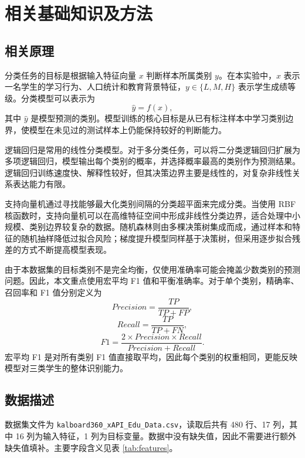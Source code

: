 \documentclass[UTF8,a4paper,12pt]{ctexart}
\begin{document}
\section{相关基础知识及方法}

\subsection{相关原理}

分类任务的目标是根据输入特征向量 $x$ 判断样本所属类别 $y$。在本实验中，$x$ 表示一名学生的学习行为、人口统计和教育背景特征，$y\in\{L,M,H\}$ 表示学生成绩等级。分类模型可以表示为
\begin{equation}
    \hat{y}=f(x),
\end{equation}
其中 $\hat{y}$ 是模型预测的类别。模型训练的核心目标是从已有标注样本中学习类别边界，使模型在未见过的测试样本上仍能保持较好的判断能力。

逻辑回归是常用的线性分类模型。对于多分类任务，可以将二分类逻辑回归扩展为多项逻辑回归，模型输出每个类别的概率，并选择概率最高的类别作为预测结果。逻辑回归训练速度快、解释性较好，但其决策边界主要是线性的，对复杂非线性关系表达能力有限。

支持向量机通过寻找能够最大化类别间隔的分类超平面来完成分类。当使用 RBF 核函数时，支持向量机可以在高维特征空间中形成非线性分类边界，适合处理中小规模、类别边界较复杂的数据。随机森林则由多棵决策树集成而成，通过样本和特征的随机抽样降低过拟合风险；梯度提升模型同样基于决策树，但采用逐步拟合残差的方式不断提高模型表现。

由于本数据集的目标类别不是完全均衡，仅使用准确率可能会掩盖少数类别的预测问题。因此，本文重点使用宏平均 F1 值和平衡准确率。对于单个类别，精确率、召回率和 F1 值分别定义为
\begin{equation}
    Precision=\frac{TP}{TP+FP},
\end{equation}
\begin{equation}
    Recall=\frac{TP}{TP+FN},
\end{equation}
\begin{equation}
    F1=\frac{2\times Precision\times Recall}{Precision+Recall}.
\end{equation}
宏平均 F1 是对所有类别 F1 值直接取平均，因此每个类别的权重相同，更能反映模型对三类学生的整体识别能力。

\subsection{数据描述}

数据集文件为 \texttt{kalboard360\_xAPI\_Edu\_Data.csv}，读取后共有 480 行、17 列，其中 16 列为输入特征，1 列为目标变量。数据中没有缺失值，因此不需要进行额外缺失值填补。主要字段含义见表 \ref{tab:features}。
\end{document}
